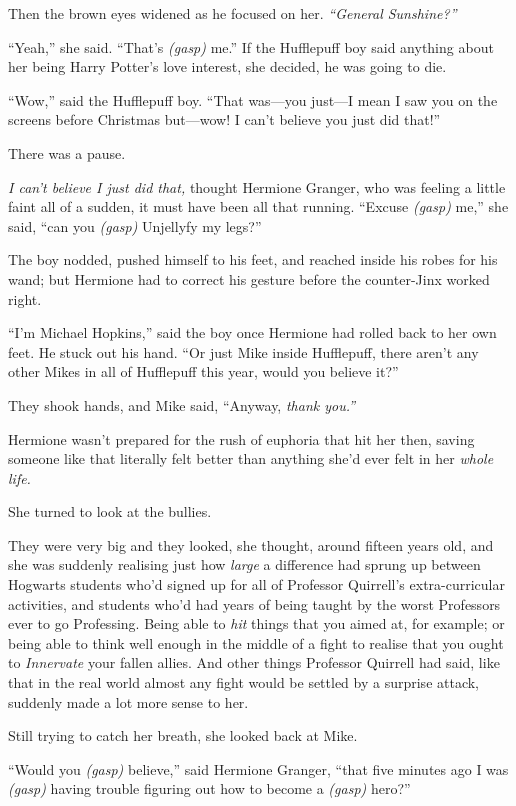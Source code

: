 Then the brown eyes widened as he focused on her. \emph{``General
Sunshine?''}

``Yeah,'' she said. ``That's \emph{(gasp)} me.'' If the Hufflepuff boy
said anything about her being Harry Potter's love interest, she decided,
he was going to die.

``Wow,'' said the Hufflepuff boy. ``That was---you just---I mean I saw
you on the screens before Christmas but---wow! I can't believe you just
did that!''

There was a pause.

\emph{I can't believe I just did that,} thought Hermione Granger, who
was feeling a little faint all of a sudden, it must have been all that
running. ``Excuse \emph{(gasp)} me,'' she said, ``can you \emph{(gasp)}
Unjellyfy my legs?''

The boy nodded, pushed himself to his feet, and reached inside his robes
for his wand; but Hermione had to correct his gesture before the
counter-Jinx worked right.

``I'm Michael Hopkins,'' said the boy once Hermione had rolled back to
her own feet. He stuck out his hand. ``Or just Mike inside Hufflepuff,
there aren't any other Mikes in all of Hufflepuff this year, would you
believe it?''

They shook hands, and Mike said, ``Anyway, \emph{thank you.''}

Hermione wasn't prepared for the rush of euphoria that hit her then,
saving someone like that literally felt better than anything she'd ever
felt in her \emph{whole life.}

She turned to look at the bullies.

They were very big and they looked, she thought, around fifteen years
old, and she was suddenly realising just how \emph{large} a difference
had sprung up between Hogwarts students who'd signed up for all of
Professor Quirrell's extra-curricular activities, and students who'd had
years of being taught by the worst Professors ever to go Professing.
Being able to \emph{hit} things that you aimed at, for example; or being
able to think well enough in the middle of a fight to realise that you
ought to \emph{Innervate} your fallen allies. And other things Professor
Quirrell had said, like that in the real world almost any fight would be
settled by a surprise attack, suddenly made a lot more sense to her.

Still trying to catch her breath, she looked back at Mike.

``Would you \emph{(gasp)} believe,'' said Hermione Granger, ``that five
minutes ago I was \emph{(gasp)} having trouble figuring out how to
become a \emph{(gasp)} hero?''

